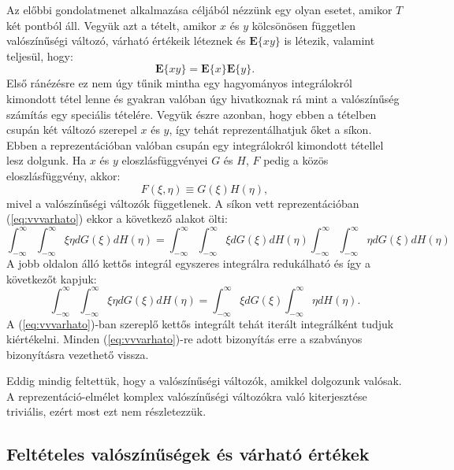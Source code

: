 \documentclass{article}
\begin{document}
Az előbbi gondolatmenet alkalmazása céljából nézzünk egy olyan esetet, amikor $T$ két pontból áll. Vegyük azt a tételt, amikor $x$ és $y$ kölcsönösen független valószínűségi változó, várható értékeik léteznek és $\mathrm{\textbf{E}}\{xy\}$ is létezik, valamint teljesül, hogy:
\begin{equation}
	\mathrm{\textbf{E}}\{xy\} = \mathrm{\textbf{E}}\{x\}\mathrm{\textbf{E}}\{y\}.
	\label{eq:vvvarhato}
\end{equation}
Első ránézésre ez nem úgy tűnik mintha egy hagyományos integrálokról kimondott tétel lenne és gyakran valóban úgy hivatkoznak rá mint a valószínűség számítás egy speciális tételére. Vegyük észre azonban, hogy ebben a tételben csupán két változó szerepel $x$ és $y$, így tehát reprezentálhatjuk őket a síkon. Ebben a reprezentációban valóban csupán egy integrálokról kimondott tétellel lesz dolgunk. Ha $x$ és $y$ eloszlásfüggvényei $G$ és $H$, $F$ pedig a közös eloszlásfüggvény, akkor:
\[
	F(\xi,\eta) \equiv G(\xi) H(\eta),
\]
mivel a valószínűségi változók függetlenek. A síkon vett reprezentációban (\ref{eq:vvvarhato}) ekkor a következő alakot ölti:
\begin{equation}
 \int_{-\infty}^{\infty} \int_{-\infty}^{\infty} \xi \eta d G(\xi) dH(\eta) = \int_{-\infty}^{\infty} \int_{-\infty}^{\infty} \xi d G(\xi) dH(\eta) \int_{-\infty}^{\infty} \int_{-\infty}^{\infty} \eta d G(\xi) dH(\eta)
\end{equation}
A jobb oldalon álló kettős integrál egyszeres integrálra redukálható és így a következőt kapjuk:
\begin{equation}
 \int_{-\infty}^{\infty} \int_{-\infty}^{\infty} \xi \eta d G(\xi) dH(\eta) = \int_{-\infty}^{\infty} \xi d G(\xi) \int_{-\infty}^{\infty} \eta dH(\eta).
\end{equation}
A (\ref{eq:vvvarhato})-ban szereplő kettős integrált tehát iterált integrálként tudjuk kiértékelni. Minden (\ref{eq:vvvarhato})-re adott bizonyítás erre a szabványos bizonyításra vezethető vissza.

Eddig mindig feltettük, hogy a valószínűségi változók, amikkel dolgozunk valósak. A reprezentáció-elmélet komplex valószínűségi változókra való kiterjesztése triviális, ezért most ezt nem részletezzük.

\subsection{Feltételes valószínűségek és várható értékek}
\end{document}
